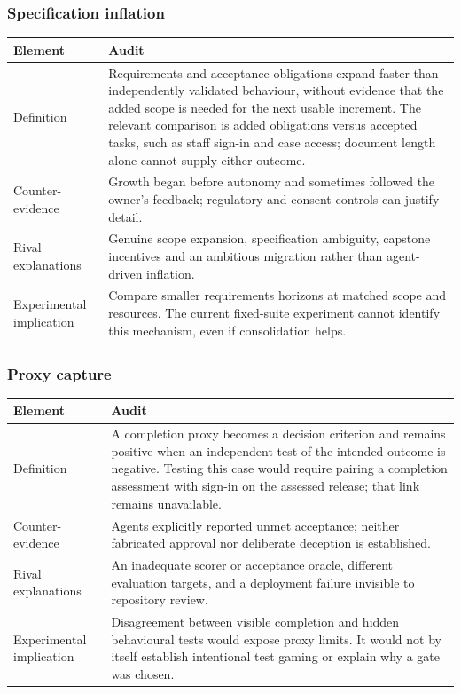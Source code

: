 \subsubsection{Specification inflation}

{\small
\noindent
\begin{tabularx}{\textwidth}{@{}L{2.6cm}Y@{}}
\toprule
Element & Audit \\
\midrule
Definition & Requirements and acceptance obligations expand faster than
independently validated behaviour, without evidence that the added scope is
needed for the next usable increment. The relevant comparison is added
obligations versus accepted tasks, such as staff sign-in and case access;
document length alone cannot supply either outcome. \\
Counter-evidence & Growth began before autonomy and sometimes followed the
owner's feedback; regulatory and consent controls can justify detail. \\
Rival explanations & Genuine scope expansion, specification ambiguity,
capstone incentives and an ambitious migration rather than agent-driven
inflation. \\
Experimental implication & Compare smaller requirements horizons at matched
scope and resources. The current fixed-suite experiment cannot identify this
mechanism, even if consolidation helps. \\
\bottomrule
\end{tabularx}
\par
}

\subsubsection{Proxy capture}

{\small
\noindent
\begin{tabularx}{\textwidth}{@{}L{2.6cm}Y@{}}
\toprule
Element & Audit \\
\midrule
Definition & A completion proxy becomes a decision criterion and remains
positive when an independent test of the intended outcome is negative.
Testing this case would require pairing a completion assessment with
sign-in on the assessed release; that link remains unavailable. \\
Counter-evidence & Agents explicitly reported unmet acceptance; neither
fabricated approval nor deliberate deception is established. \\
Rival explanations & An inadequate scorer or acceptance oracle, different
evaluation targets, and a deployment failure invisible to repository review. \\
Experimental implication & Disagreement between visible completion and hidden
behavioural tests would expose proxy limits. It would not by itself establish
intentional test gaming or explain why a gate was chosen. \\
\bottomrule
\end{tabularx}
\par
}

